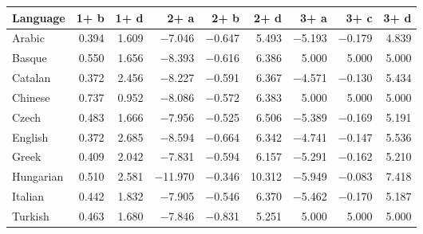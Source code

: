\begin{tabular}{lrrrrrrrr}
\toprule
 Language   &   1+ b &   1+ d &    2+ a &   2+ b &   2+ d &   3+ a &   3+ c &   3+ d \\
\midrule
 Arabic     &  \num{0.394} &  \num{1.609} &  \num{-7.046} & \num{-0.647} &  \num{5.493} & \num{-5.193} & \num{-0.179} &  \num{4.839} \\
 Basque     &  \num{0.550} &  \num{1.656} &  \num{-8.393} & \num{-0.616} &  \num{6.386} &  \num{5.000} &  \num{5.000} &  \num{5.000} \\
 Catalan    &  \num{0.372} &  \num{2.456} &  \num{-8.227} & \num{-0.591} &  \num{6.367} & \num{-4.571} & \num{-0.130} &  \num{5.434} \\
 Chinese    &  \num{0.737} &  \num{0.952} &  \num{-8.086} & \num{-0.572} &  \num{6.383} &  \num{5.000} &  \num{5.000} &  \num{5.000} \\
 Czech      &  \num{0.483} &  \num{1.666} &  \num{-7.956} & \num{-0.525} &  \num{6.506} & \num{-5.389} & \num{-0.169} &  \num{5.191} \\
 English    &  \num{0.372} &  \num{2.685} &  \num{-8.594} & \num{-0.664} &  \num{6.342} & \num{-4.741} & \num{-0.147} &  \num{5.536} \\
 Greek      &  \num{0.409} &  \num{2.042} &  \num{-7.831} & \num{-0.594} &  \num{6.157} & \num{-5.291} & \num{-0.162} &  \num{5.210} \\
 Hungarian  &  \num{0.510} &  \num{2.581} & \num{-11.970} & \num{-0.346} & \num{10.312} & \num{-5.949} & \num{-0.083} &  \num{7.418} \\
 Italian    &  \num{0.442} &  \num{1.832} &  \num{-7.905} & \num{-0.546} &  \num{6.370} & \num{-5.462} & \num{-0.170} &  \num{5.187} \\
 Turkish    &  \num{0.463} &  \num{1.680} &  \num{-7.846} & \num{-0.831} &  \num{5.251} &  \num{5.000} &  \num{5.000} &  \num{5.000} \\
\bottomrule
\end{tabular}